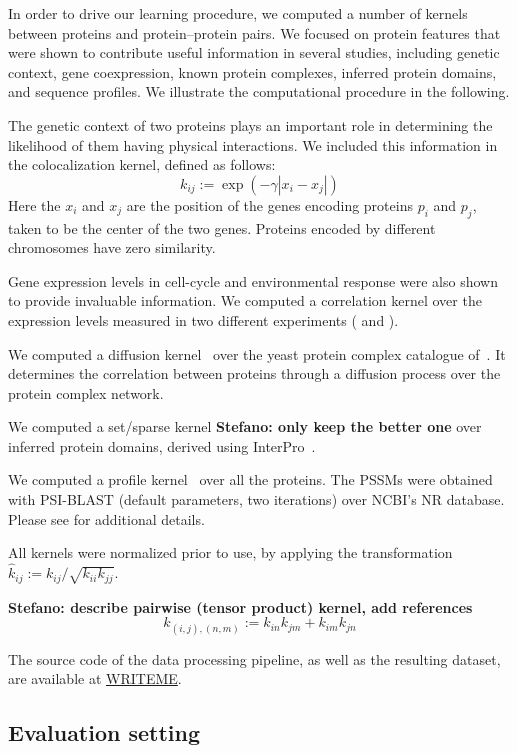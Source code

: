 \documentclass{bioinfo}
\newcommand{\stefano}[1]{{\bf \textcolor{alizarin}{{Stefano: #1}}}}
\begin{document}
In order to drive our learning procedure, we computed a number of kernels
between proteins and protein--protein pairs. We focused on protein features
that were shown to contribute useful information in several studies, including
genetic context, gene coexpression, known protein complexes, inferred
protein domains, and sequence profiles. We illustrate the computational
procedure in the following.

The genetic context of two proteins plays an important role in determining the
likelihood of them having physical interactions. We included this information
in the colocalization kernel, defined as follows:
%
$$ k_{ij} := \exp\left( - \gamma | x_i - x_j | \right) $$
%
Here the $x_i$ and $x_j$ are the position of the genes encoding proteins $p_i$
and $p_j$, taken to be the center of the two genes. Proteins encoded by
different chromosomes have zero similarity.

Gene expression levels in cell-cycle and environmental response were also shown
to provide invaluable information. We computed a correlation kernel over the
expression levels measured in two different experiments
(\cite{spellman1998comprehensive} and \cite{gasch2000genomic}).

We computed a diffusion kernel~\cite{kondor2002diffusion} over
the yeast protein complex catalogue of~\cite{pu2009up}. It determines the
correlation between proteins through a diffusion process over the protein
complex network.

We computed a set/sparse kernel \stefano{only keep the better one} over
inferred protein domains, derived using InterPro~\cite{mitchell2015interpro}.

We computed a profile kernel~\cite{kuang2005profile,hamp2013accelerating} over
all the proteins. The PSSMs were obtained with PSI-BLAST (default parameters,
two iterations) over NCBI's NR database. Please see \cite{kuang2005profile}
for additional details.

All kernels were normalized prior to use, by applying the transformation
$\hat{k}_{ij} := k_{ij}/\sqrt{k_{ii} k_{jj}}$.

\stefano{describe pairwise (tensor product) kernel, add references}
%
$$ k_{(i,j),(n,m)} := k_{in}k_{jm} + k_{im}k_{jn} $$

The source code of the data processing pipeline, as well as the resulting
dataset, are available at \url{WRITEME}.

\subsection{Evaluation setting}
\end{document}
